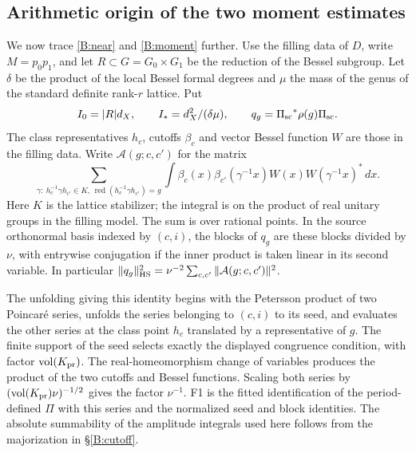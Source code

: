 \subsection{Arithmetic origin of the two moment estimates}
\label{B:arithmetic}
We now trace \eqref{B:near} and \eqref{B:moment} further.
Use the filling data of \(D\), write \(M=p_0p_1\), and let
\(R\subset G=G_0\times G_1\) be the reduction of the Bessel subgroup.
Let \(\delta\) be the product of the local Bessel formal degrees and
\(\mu\) the mass of the genus of the standard definite rank-\(r\)
lattice. Put
\[
 I_0=|R|d_X,\qquad I_*=d_X^2/(\delta\mu),\qquad q_g={\Pi_{\rm sc}}^*\rho(g){\Pi_{\rm sc}}.
\]
The class representatives \(h_c\), cutoffs \(\beta_c\) and vector
Bessel function \(W\) are those in the filling data. Write
\(\mathcal A(g;c,c')\) for the matrix
\[
 \sum_{\gamma:\ h_c^{-1}\gamma h_{c'}\in K,\,
             \operatorname{red}(h_c^{-1}\gamma h_{c'})=g}
 \int \beta_c(x)\beta_{c'}(\gamma^{-1}x)
             W(x)W(\gamma^{-1}x)^*\,dx .
\]
Here \(K\) is the lattice stabilizer; the integral is on the
product of real unitary groups in the filling model. The sum is
over rational points. In the source orthonormal basis indexed
by \((c,i)\), the blocks of \(q_g\) are these blocks divided by
\(\nu\), with entrywise conjugation if the inner product is taken
linear in its second variable. In particular
\(\|q_g\|_{\rm HS}^2=\nu^{-2}\sum_{c,c'}\|\mathcal A(g;c,c')\|^2\).

The unfolding giving this identity begins with the Petersson
product of two Poincar\'e series, unfolds the series belonging to
\((c,i)\) to its seed, and evaluates the other series at the
class point \(h_c\) translated by a representative of \(g\).
The finite support of the seed selects exactly the displayed
congruence condition, with factor \(\operatorname{vol}(K_{\rm pr})\).
The real-homeomorphism change of variables produces the product
of the two cutoffs and Bessel functions. Scaling both series
by \((\operatorname{vol}(K_{\rm pr})\nu)^{-1/2}\) gives the factor
\(\nu^{-1}\). F1 is the fitted identification of the period-defined \(\Pi\)
with this series and the normalized seed and block identities.
The absolute summability of the amplitude integrals used here
follows from the majorization in \S\ref{B:cutoff}.

